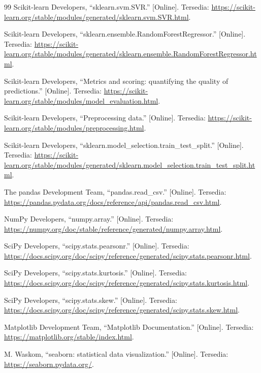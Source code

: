 \documentclass[a4paper,oneside,12pt]{report}
\begin{document}
\begin{thebibliography}{99}
     Scikit-learn Developers, ``sklearn.svm.SVR.'' [Online]. Tersedia: \url{https://scikit-learn.org/stable/modules/generated/sklearn.svm.SVR.html}.

     Scikit-learn Developers, ``sklearn.ensemble.RandomForestRegressor.'' [Online]. Tersedia: \url{https://scikit-learn.org/stable/modules/generated/sklearn.ensemble.RandomForestRegressor.html}.

     Scikit-learn Developers, ``Metrics and scoring: quantifying the quality of predictions.'' [Online]. Tersedia: \url{https://scikit-learn.org/stable/modules/model_evaluation.html}.

     Scikit-learn Developers, ``Preprocessing data.'' [Online]. Tersedia: \url{https://scikit-learn.org/stable/modules/preprocessing.html}.

     Scikit-learn Developers, ``sklearn.model\_selection.train\_test\_split.'' [Online]. Tersedia: \url{https://scikit-learn.org/stable/modules/generated/sklearn.model_selection.train_test_split.html}.

     The pandas Development Team, ``pandas.read\_csv.'' [Online]. Tersedia: \url{https://pandas.pydata.org/docs/reference/api/pandas.read_csv.html}.

     NumPy Developers, ``numpy.array.'' [Online]. Tersedia: \url{https://numpy.org/doc/stable/reference/generated/numpy.array.html}.

     SciPy Developers, ``scipy.stats.pearsonr.'' [Online]. Tersedia: \url{https://docs.scipy.org/doc/scipy/reference/generated/scipy.stats.pearsonr.html}.

     SciPy Developers, ``scipy.stats.kurtosis.'' [Online]. Tersedia: \url{https://docs.scipy.org/doc/scipy/reference/generated/scipy.stats.kurtosis.html}.

     SciPy Developers, ``scipy.stats.skew.'' [Online]. Tersedia: \url{https://docs.scipy.org/doc/scipy/reference/generated/scipy.stats.skew.html}.

     Matplotlib Development Team, ``Matplotlib Documentation.'' [Online]. Tersedia: \url{https://matplotlib.org/stable/index.html}.

     M. Waskom, ``seaborn: statistical data visualization.'' [Online]. Tersedia: \url{https://seaborn.pydata.org/}.


\end{thebibliography}
\end{document}

